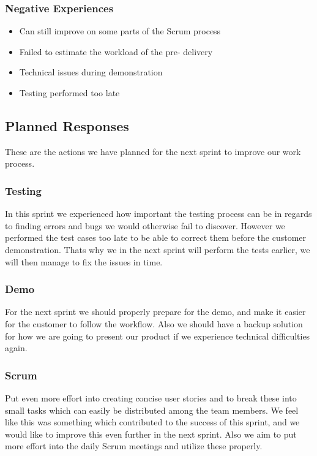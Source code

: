\subsubsection{Negative Experiences}
\begin{itemize}
\item Can still improve on some parts of the Scrum process
\item Failed to estimate the workload of the pre- delivery
\item Technical issues during demonstration
\item Testing performed too late
\end{itemize}

\subsection{Planned Responses}
These are the actions we have planned for the next sprint to improve our work process.

\subsubsection{Testing}
In this sprint we experienced how important the testing process can be in regards to finding errors and bugs we would otherwise fail to discover. However we performed the test cases too late to be able to correct them before the customer demonstration. Thats why we in the next sprint will perform the tests earlier, we will then manage to fix the issues in time.

\subsubsection{Demo}
For the next sprint we should properly prepare for the demo, and make it easier for the customer to follow the workflow. Also we should have a backup solution for how we are going to present our product if we experience technical difficulties again.

\subsubsection{Scrum}
Put even more effort into creating concise user stories and to break these into small tasks which can easily be distributed among the team members. We feel like this was something which contributed to the success of this sprint, and we would like to improve this even further in the next sprint. Also we aim to put more effort into the daily Scrum meetings and utilize these properly.